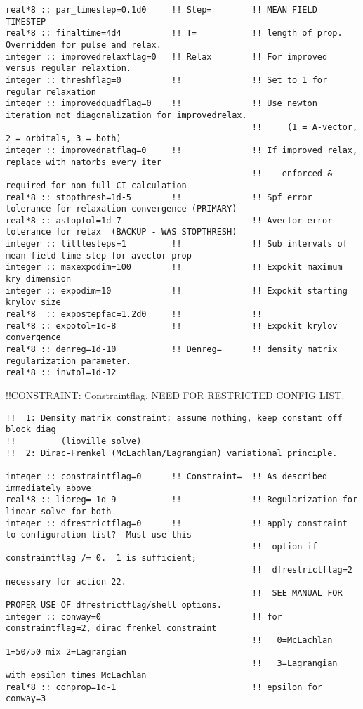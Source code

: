 \begin{verbatim}
real*8 :: par_timestep=0.1d0     !! Step=        !! MEAN FIELD TIMESTEP
real*8 :: finaltime=4d4          !! T=           !! length of prop.  Overridden for pulse and relax.  
integer :: improvedrelaxflag=0   !! Relax        !! For improved versus regular relaxtion.   
integer :: threshflag=0          !!              !! Set to 1 for regular relaxation
integer :: improvedquadflag=0    !!              !! Use newton iteration not diagonalization for improvedrelax.
                                                 !!     (1 = A-vector, 2 = orbitals, 3 = both)
integer :: improvednatflag=0     !!              !! If improved relax, replace with natorbs every iter
                                                 !!    enforced & required for non full CI calculation
real*8 :: stopthresh=1d-5        !!              !! Spf error tolerance for relaxation convergence (PRIMARY)
real*8 :: astoptol=1d-7                          !! Avector error tolerance for relax  (BACKUP - WAS STOPTHRESH)
integer :: littlesteps=1         !!              !! Sub intervals of mean field time step for avector prop
integer :: maxexpodim=100        !!              !! Expokit maximum kry dimension
integer :: expodim=10            !!              !! Expokit starting krylov size
real*8  :: expostepfac=1.2d0     !!              !! 
real*8 :: expotol=1d-8           !!              !! Expokit krylov convergence 
real*8 :: denreg=1d-10           !! Denreg=      !! density matrix regularization parameter.
real*8 :: invtol=1d-12
\end{verbatim}
!!{\large \quad CONSTRAINT: Constraintflag. NEED FOR RESTRICTED CONFIG LIST.}
\begin{verbatim}
!!  1: Density matrix constraint: assume nothing, keep constant off block diag 
!!         (lioville solve)
!!  2: Dirac-Frenkel (McLachlan/Lagrangian) variational principle.

integer :: constraintflag=0      !! Constraint=  !! As described immediately above
real*8 :: lioreg= 1d-9           !!              !! Regularization for linear solve for both
integer :: dfrestrictflag=0      !!              !! apply constraint to configuration list?  Must use this
                                                 !!  option if constraintflag /= 0.  1 is sufficient;
                                                 !!  dfrestrictflag=2 necessary for action 22. 
                                                 !!  SEE MANUAL FOR PROPER USE OF dfrestrictflag/shell options.
integer :: conway=0                              !! for constraintflag=2, dirac frenkel constraint
                                                 !!   0=McLachlan 1=50/50 mix 2=Lagrangian
                                                 !!   3=Lagrangian with epsilon times McLachlan
real*8 :: conprop=1d-1                           !! epsilon for conway=3

\end{verbatim}
